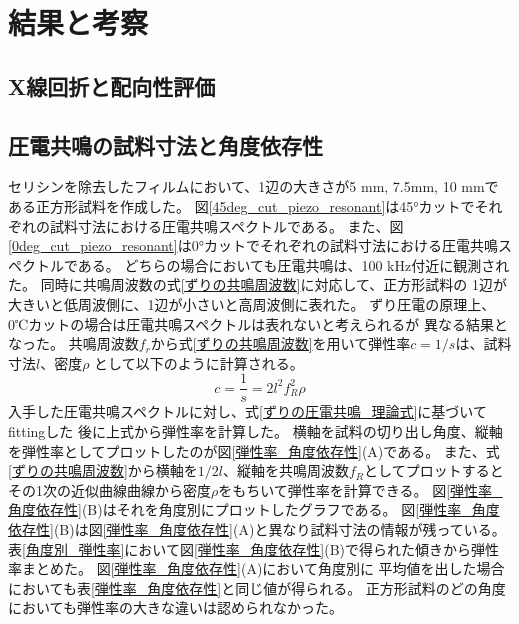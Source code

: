\documentclass[dvipdfmx,12pt,a4paper]{jreport}
\begin{document}
	\chapter{結果と考察}
			\section{X線回折と配向性評価}
			\newpage
			\section{圧電共鳴の試料寸法と角度依存性}
			セリシンを除去したフィルムにおいて、1辺の大きさが5 mm, 7.5mm, 10 mmである正方形試料を作成した。
			図\ref{45deg_cut_piezo_resonant}は45°カットでそれぞれの試料寸法における圧電共鳴スペクトルである。
			また、図\ref{0deg_cut_piezo_resonant}は0°カットでそれぞれの試料寸法における圧電共鳴スペクトルである。
			どちらの場合においても圧電共鳴は、100 kHz付近に観測された。
			同時に共鳴周波数の式\ref{ずりの共鳴周波数}に対応して、正方形試料の
			1辺が大きいと低周波側に、1辺が小さいと高周波側に表れた。
			ずり圧電の原理上、0℃カットの場合は圧電共鳴スペクトルは表れないと考えられるが
			異なる結果となった。
			共鳴周波数$f_r$から式\ref{ずりの共鳴周波数}を用いて弾性率$c=1/s$は、試料寸法$l$、密度$\rho$
			として以下のように計算される。
			\begin{equation}
				c = \frac{1}{s} = 2l^2 f_R^2 \rho
			\end{equation}
			入手した圧電共鳴スペクトルに対し、式\ref{ずりの圧電共鳴_理論式}に基づいてfittingした
			後に上式から弾性率を計算した。
			横軸を試料の切り出し角度、縦軸を弾性率としてプロットしたのが図\ref{弾性率_角度依存性}(A)である。
			また、式\ref{ずりの共鳴周波数}から横軸を$1/2l$、縦軸を共鳴周波数$f_R$としてプロットすると
			その1次の近似曲線曲線から密度$\rho$をもちいて弾性率を計算できる。
			図\ref{弾性率_角度依存性}(B)はそれを角度別にプロットしたグラフである。
			図\ref{弾性率_角度依存性}(B)は図\ref{弾性率_角度依存性}(A)と異なり試料寸法の情報が残っている。
			表\ref{角度別_弾性率}において図\ref{弾性率_角度依存性}(B)で得られた傾きから弾性率まとめた。
			図\ref{弾性率_角度依存性}(A)において角度別に
			平均値を出した場合においても表\ref{弾性率_角度依存性}と同じ値が得られる。
			正方形試料のどの角度においても弾性率の大きな違いは認められなかった。
\end{document}
